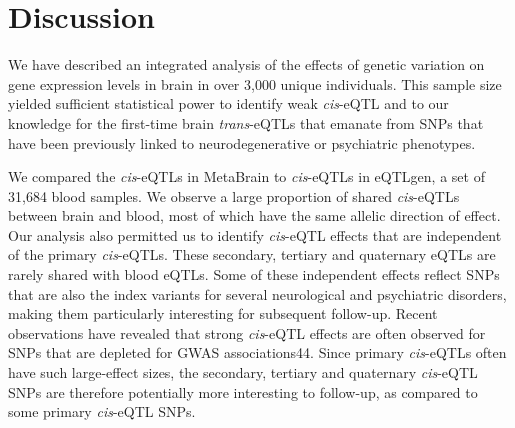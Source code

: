 {\section{Discussion}

We have described an integrated analysis of the effects of genetic variation on gene expression levels in brain in over 3,000 unique individuals. This sample size yielded sufficient statistical power to identify weak \emph{cis}-eQTL and to our knowledge for the first-time brain \emph{trans}-eQTLs that emanate from SNPs that have been previously linked to neurodegenerative or psychiatric phenotypes. 

We compared the \emph{cis}-eQTLs in MetaBrain to \emph{cis}-eQTLs in eQTLgen, a set of 31,684 blood samples. We observe a large proportion of shared \emph{cis}-eQTLs between brain and blood, most of which have the same allelic direction of effect. Our analysis also permitted us to identify \emph{cis}-eQTL effects that are independent of the primary \emph{cis}-eQTLs. These secondary, tertiary and quaternary eQTLs are rarely shared with blood eQTLs. Some of these independent effects reflect SNPs that are also the index variants for several neurological and psychiatric disorders, making them particularly interesting for subsequent follow-up. Recent observations have revealed that strong \emph{cis}-eQTL effects are often observed for SNPs that are depleted for GWAS associations44. Since primary \emph{cis}-eQTLs often have such large-effect sizes, the secondary, tertiary and quaternary \emph{cis}-eQTL SNPs are therefore potentially more interesting to follow-up, as compared to some primary \emph{cis}-eQTL SNPs. 

}
